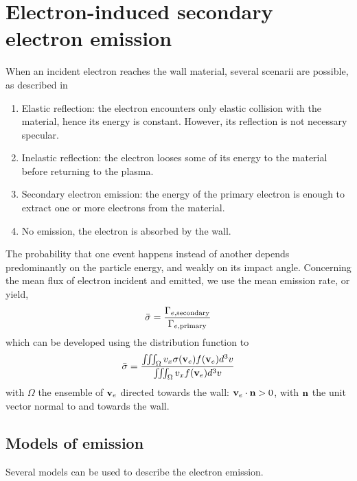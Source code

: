 
\section{Electron-induced secondary electron emission}
\label{sec-seemodel}
When an incident electron reaches the wall material, several scenarii are possible, as described in \citet{villemant2018}
\begin{enumerate}
  \item Elastic reflection\string: the electron encounters only elastic collision with the material, hence its energy is constant. However, its reflection is not necessary specular.
  \item Inelastic reflection\string: the electron looses some of its energy to the material before returning to the plasma.
  \item Secondary electron emission\string: the energy of the primary electron is enough to extract one or more electrons from the material.
  \item No emission, the electron is absorbed by the wall.
\end{enumerate}

The probability \proba{}  that one event happens instead of another depends predominantly on the particle energy, and weakly on its  impact angle.
Concerning the mean flux of electron incident and emitted, we use the mean emission rate, or yield, \rate
\begin{equation*} \label{eq-ratedifinition}
   \bar{\sigma } = \frac{\Gamma_{e, \rm secondary}}{\Gamma_{e, \rm primary}}
\end{equation*}
which can be developed using the distribution function to 
\begin{equation} 
  \label{eq-ratedifinition_evdf}
   \bar{\sigma } = \frac{\iiint_{\Omega} v_x \sigma ({\mathbf v_e}) f({\mathbf v_e}) d^3v}{\iiint_{\Omega} v_x  f({\mathbf v_e}) d^3v}
\end{equation}
with $\Omega$ the ensemble of ${\mathbf v_e}$ directed towards the wall\string: ${\mathbf v_e} \cdot {\mathbf n} > 0$, with ${\mathbf n} $ the unit vector normal to and towards the wall.

\subsection{Models of emission } \label{subsec-seemodels}
Several models can be used to describe the electron emission.

